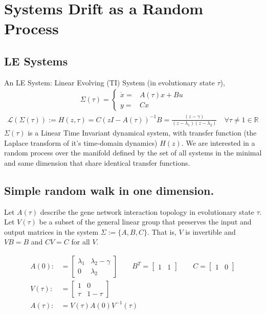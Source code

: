 \documentclass[11 pt]{article}
\newcommand{\1}{\mathbbm{1}}
\begin{document}
  \section{Systems Drift as a Random Process}
  \subsection{LE Systems}
    An LE System: Linear Evolving (TI) System (in evolutionary state $\tau$), 
    \begin{align*}
      \Sigma(\tau) = \left\{ \begin{array}{cc} \dot{x} =& A(\tau)x + Bu \\
      y =& Cx \end{array} \right.
    \end{align*}
    \begin{align*}
      \mathcal{L}(\Sigma(\tau)) := H(z, \tau) = C \left(zI - A(\tau) \right)^{-1} B = \frac{(z-\gamma)}{(z-\lambda_{1})(z-\lambda_{2})} \quad \forall \tau \neq 1 \in \mathbb{R}
    \end{align*}
 $\Sigma(\tau)$ is a Linear Time Invariant dynamical system, with transfer function (the Laplace transform of it's time-domain dynamics) $H(z)$. We are interested in a random process over the manifold defined by the set of all systems in the minimal and same dimension that share identical transfer functions. 

  \subsection{Simple random walk in one dimension.}
  Let $A(\tau)$ describe the gene network interaction topology in evolutionary state $\tau$. Let $V(\tau)$ be a subset of the general linear group that preserves the input and output matrices in the system $\Sigma := \{ A, B, C \}$. That is, $V$ is invertible and $VB = B$ and $CV = C$ for all $V$.

  \begin{align*}
    A(0) :&= \begin{bmatrix} \lambda_{1} & \lambda_{2} - \gamma \\ 0 & \lambda_{2} \end{bmatrix} \qquad B^{T} = \begin{bmatrix} 1 & 1 \end{bmatrix} \qquad C = \begin{bmatrix} 1 & 0 \end{bmatrix} \\
    V(\tau) :&= \begin{bmatrix} 1 & 0 \\ \tau & 1-\tau \end{bmatrix} \\
    A(\tau) :&= V(\tau)A(0)V^{-1}(\tau)
  \end{align*}
\end{document}
